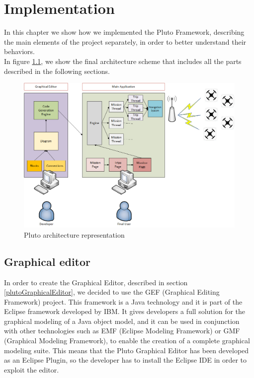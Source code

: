 \chapter{Implementation}
\label{cap5}

In this chapter we show how we implemented the Pluto Framework, describing the main elements of the project separately, in order to better understand their behaviors.
\\
In figure \ref{fig:finalArchitecture}, we show the final architecture scheme that includes all the parts described in the following sections.
\\

 \begin{figure}
 \includegraphics[width=\linewidth]
 {pictures/Final_Architecture.png}
 \caption{Pluto architecture representation}
 \label{fig:finalArchitecture}
 \end{figure}

\section{Graphical editor}\label{editor}

In order to create the Graphical Editor, described in section \ref{plutoGraphicalEditor}, we decided to use the GEF (Graphical Editing Framework) project. This framework is a Java technology and it is part of the Eclipse framework developed by IBM.
It gives developers a full solution for the  graphical modeling of a Java object model, and it can be used in conjunction with other technologies such as EMF (Eclipse Modeling Framework) or GMF (Graphical Modeling Framework), to enable the creation of a complete graphical modeling suite. 
This means that the Pluto Graphical Editor has been developed as an Eclipse Plugin, so the developer has to install the Eclipse IDE in order to exploit the editor.
\\

